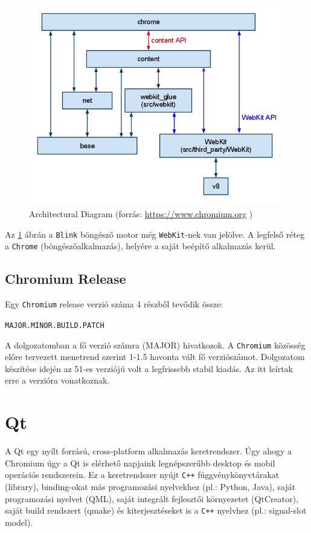 \documentclass[12pt]{report}
\let\origurl\url
\renewcommand{\url}[1]{%
    \textcolor{blue}{\origurl{#1}}
}
\begin{document}
\begin{figure}[h]
    \centering
    \includegraphics[scale=0.6]{chromium_architecture}
    \caption{
        \label{fig-chromium-architecture}
        Architectural Diagram
        (forrás: \url{https://www.chromium.org} \cite{bib-chromium-content-module})
    }
\end{figure}

Az \ref{fig-chromium-architecture} ábrán a \texttt{Blink} böngésző motor még
\texttt{WebKit}-nek van jelölve.
A legfelső réteg a \texttt{Chrome} (böngészőalkalmazás), helyére a saját beépítő alkalmazás
kerül.

\subsection{Chromium Release}
Egy \texttt{Chromium} release verzió száma 4 részből tevődik össze:
\begin{center}
    \texttt{MAJOR.MINOR.BUILD.PATCH}
\end{center}
A dolgozatomban a fő verzió számra (MAJOR) hivatkozok.
A \texttt{Chromium} közösség előre tervezett menetrend szerint 1-1.5 havonta vált fő
verziószámot. Dolgozatom készítése idején az 51-es verziójú volt a legfrissebb stabil kiadás.
Az itt leírtak erre a verzióra vonatkoznak.


\section{Qt}
A Qt egy nyílt forrású, cross-platform alkalmazás keretrendszer. Úgy ahogy a
Chromium úgy a Qt is elérhető napjaink legnépszerűbb desktop és mobil
operációs rendszerein. Ez a keretrendszer nyújt \texttt{C++} függvénykönyvtárakat (library),
binding-okat más programozási nyelvekhez (pl.: Python, Java), saját programozási nyelvet
(QML), saját integrált fejlesztői környezetet (QtCreator), saját build rendszert
(qmake) és kiterjesztéseket is a \texttt{C++} nyelvhez (pl.: signal-slot model).
\cite{bib-qt-wiki-about-qt}
\end{document}
